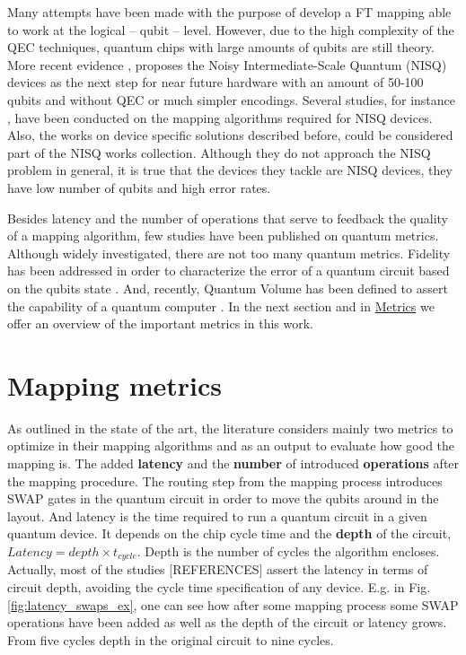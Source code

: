 Many attempts have been made \cite{Dousti_2014,Heckey_2015,hwang18:hierar_system_mappin_large_scale,murphy18:contr,Lao_2018} with the purpose of develop a FT mapping able to work at the logical -- qubit -- level.
However, due to the high complexity of the QEC techniques, quantum chips with large amounts of qubits are still theory.
More recent evidence \cite{Preskill_2018}, proposes the Noisy Intermediate-Scale Quantum (NISQ) devices as the next step for near future hardware with an amount of 50-100 qubits and without QEC or much simpler encodings.
Several studies, for instance \cite{tannu18:case_variab_aware_polic_nisq,paler18:nisq,paler18:influen_initial_qubit_placem_durin}, have been conducted on the mapping algorithms required for NISQ devices.
Also, the works on device specific solutions \cite{zulehner17:effic_method_mappin_quant_circuit,Siraichi_2018,mckay18:qiskit_backen_specif_openq_openp_exper,Dueck_2018,Venturelli_2018} described before, could be considered part of the NISQ works collection.
Although they do not approach the NISQ problem in general, it is true that the devices they tackle are NISQ devices, they have low number of qubits and high error rates.

Besides latency and the number of operations that serve to feedback the quality of a mapping algorithm, few studies have been published on quantum metrics.
Although widely investigated, there are not too many quantum metrics.
Fidelity has been addressed in order to characterize the error of a quantum circuit based on the qubits state \cite{Jozsa_1994,Nielsen_2009}.
And, recently, Quantum Volume has been defined to assert the capability of a quantum computer \cite{Moll_2018}.
In the next section and in \href{chapter-3.org}{Metrics} we offer an overview of the important metrics in this work.

\section*{Mapping metrics}
\label{sec:orgea4b2ef}
As outlined in the state of the art, the literature considers mainly two metrics to optimize in their mapping algorithms and as an output to evaluate how good the mapping is.
The added \textbf{latency} and the \textbf{number} of introduced \textbf{operations} after the mapping procedure.
The routing step from the mapping process introduces SWAP gates in the quantum circuit in order to move the qubits around in the layout.
And latency is the time required to run a quantum circuit in a given quantum device.
It depends on the chip cycle time and the \textbf{depth} of the circuit, \(Latency = depth \times t_{cycle}\).
Depth is the number of cycles the algorithm encloses.
Actually, most of the studies [REFERENCES] assert the latency in terms of circuit depth, avoiding the cycle time specification of any device.
E.g. in Fig. \ref{fig:latency_swaps_ex}, one can see how after some mapping process some SWAP operations have been added as well as the depth of the circuit or latency grows.
From five cycles depth in the original circuit to nine cycles.

